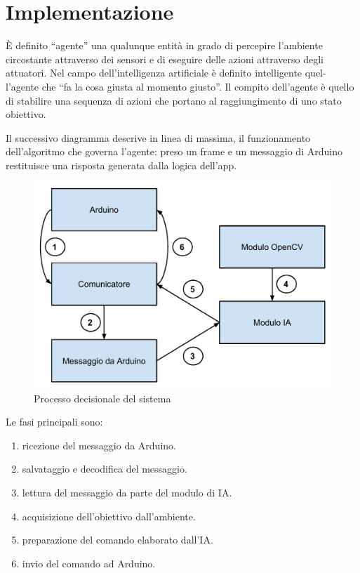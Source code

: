 \chapter{Implementazione}
\fancyfoot[C]{\thepage }
È definito ``agente'' una qualunque entità in grado di percepire l'ambiente
circostante attraverso dei sensori e di eseguire delle azioni attraverso degli
attuatori. Nel campo dell'intelligenza artificiale è definito intelligente quel-
l'agente che ``fa la cosa giusta al momento giusto''. Il compito dell'agente è
quello di stabilire una sequenza di azioni che portano al raggiungimento di
uno stato obiettivo.\cite{agente}

Il successivo diagramma descrive in linea di massima, il funzionamento dell'algoritmo che governa l'agente: preso un frame e un messaggio
di Arduino restituisce una risposta generata dalla logica dell'app.
\begin{figure}[H] \center
\includegraphics[width=\textwidth]{immagini/schema_processo_new.pdf}
\caption{Processo decisionale del sistema} 
\end{figure}
Le fasi principali sono:
\begin{enumerate}
\item ricezione del messaggio da Arduino.
\item salvataggio e decodifica del messaggio.
\item lettura del messaggio da parte del modulo di IA.
\item acquisizione dell'obiettivo dall'ambiente.
\item preparazione del comando elaborato dall'IA.
\item invio del comando ad Arduino.
\end{enumerate}

